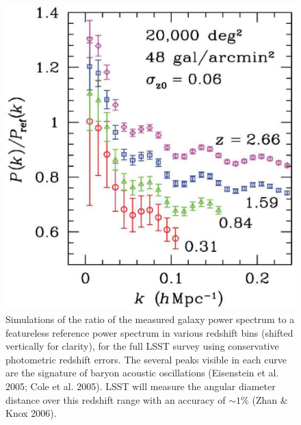 \documentclass{emulateapj}
\begin{document}
\begin{figure}
\includegraphics[width=1.0\hsize,clip]{bao.pdf}
\caption{Simulations of the ratio of the measured galaxy power spectrum to 
a featureless reference power spectrum in various redshift bins (shifted vertically 
for clarity), for the full LSST survey using conservative photometric redshift
errors. The several peaks visible in each curve are the signature of baryon acoustic 
oscillations (Eisenstein et al. 2005; Cole et al. 2005). LSST will measure the 
angular diameter distance over this redshift range with an accuracy of $\sim1$\% 
(Zhan \& Knox 2006).} 
\label{Fig:bao}
\end{figure}
\end{document}
